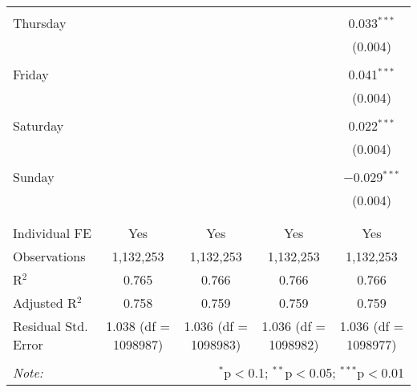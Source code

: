 \documentclass[
]{article}
\begin{document}
\begin{table}[!htbp]
{\begin{tabular}{@{\extracolsep{5pt}}lcccc}
  & & & & \\ 
 Thursday &  &  &  & 0.033$^{***}$ \\ 
  &  &  &  & (0.004) \\ 
  & & & & \\ 
 Friday &  &  &  & 0.041$^{***}$ \\ 
  &  &  &  & (0.004) \\ 
  & & & & \\ 
 Saturday &  &  &  & 0.022$^{***}$ \\ 
  &  &  &  & (0.004) \\ 
  & & & & \\ 
 Sunday &  &  &  & $-$0.029$^{***}$ \\ 
  &  &  &  & (0.004) \\ 
  & & & & \\ 
\hline \\[-1.8ex] 
Individual FE & Yes & Yes & Yes & Yes \\ 
Observations & 1,132,253 & 1,132,253 & 1,132,253 & 1,132,253 \\ 
R$^{2}$ & 0.765 & 0.766 & 0.766 & 0.766 \\ 
Adjusted R$^{2}$ & 0.758 & 0.759 & 0.759 & 0.759 \\ 
Residual Std. Error & 1.038 (df = 1098987) & 1.036 (df = 1098983) & 1.036 (df = 1098982) & 1.036 (df = 1098977) \\ 
\hline 
\hline \\[-1.8ex] 
\textit{Note:}  & \multicolumn{4}{r}{$^{*}$p$<$0.1; $^{**}$p$<$0.05; $^{***}$p$<$0.01} \\ 
\end{tabular}
} 
\end{table} 
\newpage
\end{document}
